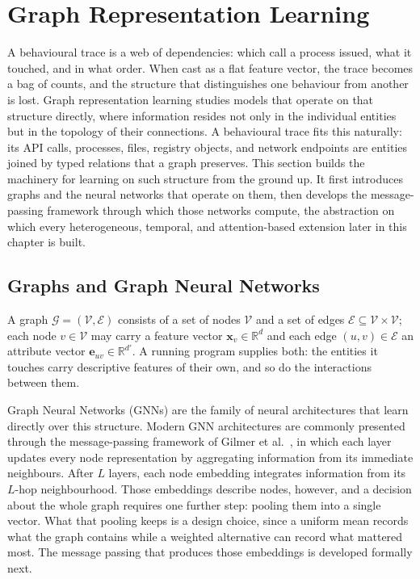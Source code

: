\documentclass[%
    BCOR=10mm,
    DIV=13,
    toc=bibliography,
    toc=listof,
    oneside,
    12pt,
]{scrbook}
\begin{document}
\section{Graph Representation Learning}
\label{sec:graph_rl}

A behavioural trace is a web of dependencies: which call a process issued, what it
touched, and in what order. When cast as a flat feature vector, the trace
becomes a bag of counts, and the structure that distinguishes one behaviour
from another is lost. Graph representation learning studies models that operate
on that structure directly, where information resides not only in the
individual entities but in the topology of their connections. A behavioural trace fits this naturally: its API
calls, processes, files, registry objects, and network endpoints are entities
joined by typed relations that a graph preserves. This
section builds the machinery for learning on such structure from the ground up.
It first introduces graphs and the neural networks that operate on them, then
develops the message-passing framework through which those networks compute, the
abstraction on which every heterogeneous, temporal, and attention-based extension
later in this chapter is built.

\subsection{Graphs and Graph Neural Networks}
\label{subsec:gnn_general}

A graph $\mathcal{G} =
(\mathcal{V}, \mathcal{E})$ consists of a set of nodes $\mathcal{V}$ and a set
of edges $\mathcal{E} \subseteq \mathcal{V} \times \mathcal{V}$; each node $v
\in \mathcal{V}$ may carry a feature vector $\mathbf{x}_v \in \mathbb{R}^d$
and each edge $(u, v) \in \mathcal{E}$ an attribute vector $\mathbf{e}_{uv}
\in \mathbb{R}^{d'}$. A running program supplies both: the entities it touches
carry descriptive features of their own, and so do the interactions between
them.

Graph Neural Networks (GNNs) are the family of neural architectures that learn
directly over this structure. Modern GNN architectures are commonly presented
through the message-passing framework of Gilmer et
al.~\cite{gilmer2017mpnn}, in which each layer updates every node
representation by aggregating information from its immediate neighbours. After
$L$ layers, each node embedding integrates information from its $L$-hop
neighbourhood. Those embeddings describe nodes, however, and a decision about
the whole graph requires one further step: pooling them into a single vector.
What that pooling keeps is a design choice, since a uniform mean records what
the graph contains while a weighted alternative can record what mattered most.
The message passing that produces those embeddings is developed formally
next.
\end{document}
